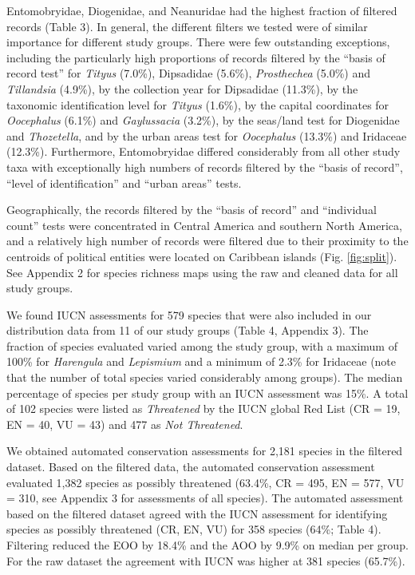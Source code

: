 \documentclass[fleqn,10pt,lineno]{wlpeerj} %
\begin{document}
Entomobryidae, Diogenidae, and Neanuridae had the highest fraction of filtered records (Table 3). In general, the different filters we tested were of similar importance for different study groups. There were few outstanding exceptions, including the particularly high proportions of records filtered by the ``basis of record test'' for \emph{Tityus} (7.0\%), Dipsadidae (5.6\%), \emph{Prosthechea} (5.0\%) and \emph{Tillandsia} (4.9\%), by the collection year for Dipsadidae (11.3\%), by the taxonomic identification level for \emph{Tityus} (1.6\%), by the capital coordinates for \emph{Oocephalus} (6.1\%) and \emph{Gaylussacia} (3.2\%), by the seas/land test for Diogenidae and \emph{Thozetella}, and by the urban areas test for \emph{Oocephalus} (13.3\%) and Iridaceae (12.3\%). Furthermore, Entomobryidae differed considerably from all other study taxa with exceptionally high numbers of records filtered by the ``basis of record'', ``level of identification'' and ``urban areas'' tests.

Geographically, the records filtered by the ``basis of record'' and ``individual count'' tests were concentrated in Central America and southern North America, and a relatively high number of records were filtered due to their proximity to the centroids of political entities were located on Caribbean islands (Fig. \ref{fig:split}). See Appendix 2 for species richness maps using the raw and cleaned data for all study groups.

We found IUCN assessments for 579 species that were also included in our distribution data from 11 of our study groups (Table 4, Appendix 3). The fraction of species evaluated varied among the study group, with a maximum of 100\% for \emph{Harengula} and \emph{Lepismium} and a minimum of 2.3\% for Iridaceae (note that the number of total species varied considerably among groups). The median percentage of species per study group with an IUCN assessment was 15\%. A total of 102 species were listed as \emph{Threatened} by the IUCN global Red List (CR = 19, EN = 40, VU = 43) and 477 as \emph{Not Threatened}.

We obtained automated conservation assessments for 2,181 species in the filtered dataset. Based on the filtered data, the automated conservation assessment evaluated 1,382 species as possibly threatened (63.4\%, CR = 495, EN = 577, VU = 310, see Appendix 3 for assessments of all species). The automated assessment based on the filtered dataset agreed with the IUCN assessment for identifying species as possibly threatened (CR, EN, VU) for 358 species (64\%; Table 4). Filtering reduced the EOO by 18.4\% and the AOO by 9.9\% on median per group. For the raw dataset the agreement with IUCN was higher at 381 species (65.7\%).
\end{document}
